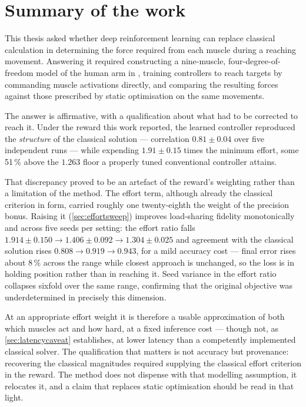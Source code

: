 
\label{ch:conclusion}

\section{Summary of the work}

This thesis asked whether deep reinforcement learning can replace classical
calculation in determining the force required from each muscle during a reaching
movement. Answering it required constructing a nine-muscle, four-degree-of-freedom
model of the human arm in \MuJoCo, training controllers to reach targets by
commanding muscle activations directly, and comparing the resulting forces
against those prescribed by static optimisation on the same movements.

The answer is affirmative, with a qualification about what had to be corrected
to reach it. Under the reward this work reported, the learned controller
reproduced the \emph{structure} of the classical solution --- correlation
$0.81 \pm 0.04$ over five independent runs --- while expending $1.91 \pm 0.15$
times the minimum effort, some 51\,\% above the $1.263$ floor a properly tuned
conventional controller attains.

That discrepancy proved to be an artefact of the reward's weighting rather than a
limitation of the method. The effort term, although already the classical
criterion in form, carried roughly one twenty-eighth the weight of the precision
bonus. Raising it (\cref{sec:effortsweep}) improves load-sharing fidelity
monotonically and across five seeds per setting: the effort ratio falls
$1.914 \pm 0.150 \rightarrow 1.406 \pm 0.092 \rightarrow 1.304 \pm 0.025$ and
agreement with the classical solution rises
$0.808 \rightarrow 0.919 \rightarrow 0.943$, for a mild accuracy cost --- final
error rises about 8\,\% across the range while closest approach is unchanged, so
the loss is in holding position rather than in reaching it. Seed variance in the
effort ratio collapses sixfold over the same range, confirming that the original
objective was underdetermined in precisely this dimension.

At an appropriate effort weight it is therefore a usable approximation of both
which muscles act and how hard, at a fixed inference cost --- though not, as
\cref{sec:latencycaveat} establishes, at lower latency than a competently
implemented classical solver. The qualification that matters is not accuracy but
provenance: recovering the classical magnitudes required supplying the classical
effort criterion in the reward. The method does not dispense with that modelling
assumption, it relocates it, and a claim that \DRL{} replaces static optimisation
should be read in that light.

